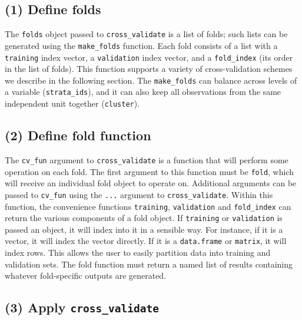 \documentclass[12pt, krantz2,]{book}
\theoremstyle{definition}
\theoremstyle{definition}
\theoremstyle{definition}
\newcommand{\1}{\mathbbm{1}}
\begin{document}
\hypertarget{define-folds}{%
\subsection{(1) Define folds}\label{define-folds}}

The \texttt{folds} object passed to \texttt{cross\_validate} is a list of folds; such lists can
be generated using the \texttt{make\_folds} function. Each fold consists of a list with
a \texttt{training} index vector, a \texttt{validation} index vector, and a \texttt{fold\_index} (its
order in the list of folds). This function supports a variety of
cross-validation schemes we describe in the following section. The \texttt{make\_folds}
can balance across levels of a variable (\texttt{strata\_ids}), and it can also keep
all observations from the same independent unit together (\texttt{cluster}).

\hypertarget{define-fold-function}{%
\subsection{(2) Define fold function}\label{define-fold-function}}

The \texttt{cv\_fun} argument to \texttt{cross\_validate} is a function that will perform some
operation on each fold. The first argument to this function must be \texttt{fold},
which will receive an individual fold object to operate on. Additional arguments
can be passed to \texttt{cv\_fun} using the \texttt{...} argument to \texttt{cross\_validate}. Within
this function, the convenience functions \texttt{training}, \texttt{validation} and
\texttt{fold\_index} can return the various components of a fold object. If \texttt{training}
or \texttt{validation} is passed an object, it will index into it in a sensible way.
For instance, if it is a vector, it will index the vector directly. If it is a
\texttt{data.frame} or \texttt{matrix}, it will index rows. This allows the user to easily
partition data into training and validation sets. The fold function must return
a named list of results containing whatever fold-specific outputs are generated.

\hypertarget{apply-cross_validate}{%
\subsection{\texorpdfstring{(3) Apply \texttt{cross\_validate}}{(3) Apply cross\_validate}}\label{apply-cross_validate}}
\end{document}
